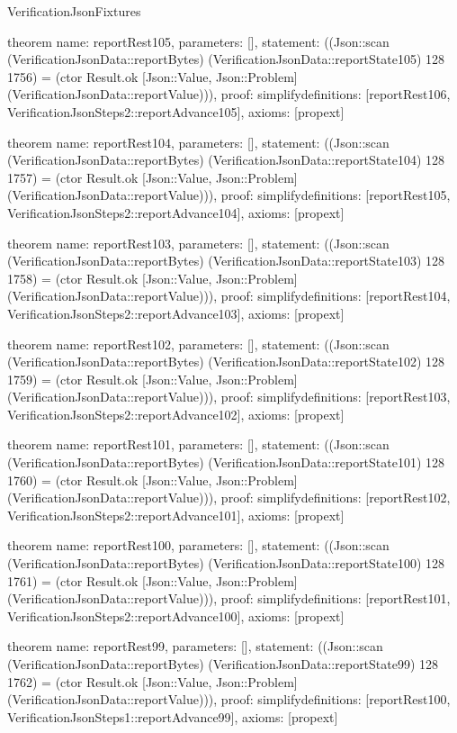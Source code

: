 \begin{lexlean}{VerificationJsonFixtures}
\begin{semanticmodule}
theorem{
  name: reportRest105,
  parameters: [],
  statement: ((Json::scan (VerificationJsonData::reportBytes) (VerificationJsonData::reportState105) 128 1756) = (ctor Result.ok [Json::Value, Json::Problem] (VerificationJsonData::reportValue))),
  proof: simplify{definitions: [reportRest106, VerificationJsonSteps2::reportAdvance105]},
  axioms: [propext]
}

theorem{
  name: reportRest104,
  parameters: [],
  statement: ((Json::scan (VerificationJsonData::reportBytes) (VerificationJsonData::reportState104) 128 1757) = (ctor Result.ok [Json::Value, Json::Problem] (VerificationJsonData::reportValue))),
  proof: simplify{definitions: [reportRest105, VerificationJsonSteps2::reportAdvance104]},
  axioms: [propext]
}

theorem{
  name: reportRest103,
  parameters: [],
  statement: ((Json::scan (VerificationJsonData::reportBytes) (VerificationJsonData::reportState103) 128 1758) = (ctor Result.ok [Json::Value, Json::Problem] (VerificationJsonData::reportValue))),
  proof: simplify{definitions: [reportRest104, VerificationJsonSteps2::reportAdvance103]},
  axioms: [propext]
}

theorem{
  name: reportRest102,
  parameters: [],
  statement: ((Json::scan (VerificationJsonData::reportBytes) (VerificationJsonData::reportState102) 128 1759) = (ctor Result.ok [Json::Value, Json::Problem] (VerificationJsonData::reportValue))),
  proof: simplify{definitions: [reportRest103, VerificationJsonSteps2::reportAdvance102]},
  axioms: [propext]
}

theorem{
  name: reportRest101,
  parameters: [],
  statement: ((Json::scan (VerificationJsonData::reportBytes) (VerificationJsonData::reportState101) 128 1760) = (ctor Result.ok [Json::Value, Json::Problem] (VerificationJsonData::reportValue))),
  proof: simplify{definitions: [reportRest102, VerificationJsonSteps2::reportAdvance101]},
  axioms: [propext]
}

theorem{
  name: reportRest100,
  parameters: [],
  statement: ((Json::scan (VerificationJsonData::reportBytes) (VerificationJsonData::reportState100) 128 1761) = (ctor Result.ok [Json::Value, Json::Problem] (VerificationJsonData::reportValue))),
  proof: simplify{definitions: [reportRest101, VerificationJsonSteps2::reportAdvance100]},
  axioms: [propext]
}

theorem{
  name: reportRest99,
  parameters: [],
  statement: ((Json::scan (VerificationJsonData::reportBytes) (VerificationJsonData::reportState99) 128 1762) = (ctor Result.ok [Json::Value, Json::Problem] (VerificationJsonData::reportValue))),
  proof: simplify{definitions: [reportRest100, VerificationJsonSteps1::reportAdvance99]},
  axioms: [propext]
}


\end{semanticmodule}
\end{lexlean}
